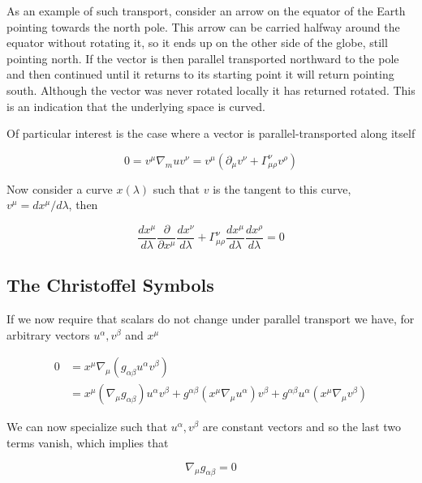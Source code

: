 As an example of such transport, consider an arrow on the equator of
the Earth pointing towards the north pole.  This arrow can be carried
halfway around the equator without rotating it, so it ends up on the
other side of the globe, still pointing north.  If the vector is then
parallel transported northward to the pole and then continued until it
returns to its starting point it will return pointing south.  Although
the vector was never rotated locally it has returned rotated.  This is
an indication that the underlying space is curved.

Of particular interest is the case where a vector is
parallel-transported along itself

\begin{equation*}
0 = v^\mu \nabla_mu v^\nu 
= v^\mu (\partial_\mu v^\nu + \Gamma^\nu_{\mu\rho} v^\rho)
\end{equation*}

Now consider a curve $x(\lambda)$ such that $v$ is the tangent to this
curve, $v^\mu = d x^\mu/d\lambda$, then

\begin{equation}
\label{eq:geodesic}
\frac{d x^\mu}{d\lambda}
  \frac{\partial }{\partial x^\mu}
  \frac{d x^\nu}{d\lambda}  
+ \Gamma^\nu_{\mu\rho} 
\frac{d x^\mu}{d\lambda}
\frac{d x^\rho}{d\lambda} = 0
\end{equation}

\subsection{The Christoffel Symbols}

If we now require that scalars do not change under parallel transport
we have, for arbitrary vectors $u^\alpha, v^\beta$ and $x^\mu$

\begin{align*}
0 &= x^\mu \nabla_\mu (g_{\alpha\beta} u^\alpha v^\beta) \\
&= x^\mu (\nabla_\mu g_{\alpha\beta}) u^\alpha v^\beta
+ g^{\alpha\beta} (x^\mu \nabla_\mu u^\alpha) v^\beta
+ g^{\alpha\beta} u^\alpha (x^\mu \nabla_\mu v^\beta)
\end{align*}

We can now specialize such that $u^\alpha, v^\beta$ are constant
vectors and so the last two terms vanish, which implies that

\begin{equation}
\label{eq:metric_compatibility}
\nabla_\mu g_{\alpha\beta} = 0
\end{equation}

